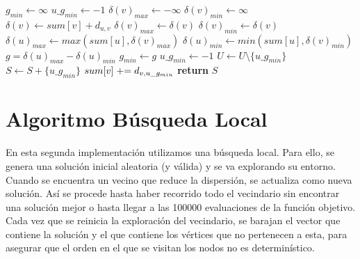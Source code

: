 \begin{algorithm}[H]
\begin{algorithmic}
 
    \State $g_{min} \gets \infty$
    \State $u\_g_{min} \gets -1$
    \State
        \State $\delta(v)_{max} \gets -\infty$
        \State $\delta(v)_{min} \gets \infty$
        \State
            \State $\delta(v) \gets sum[v] + d_{u,v}$
                \State $\delta(v)_{max} \gets \delta(v)$
            \EndIf
                \State $\delta(v)_{min} \gets \delta(v)$
            \EndIf
            \State
            \State $\delta(u)_{max} \gets max(sum[u], \delta(v)_{max})$
            \State $\delta(u)_{min} \gets min(sum[u], \delta(v)_{min})$
            \State $g = \delta(u)_{max} - \delta(u)_{min}$
                \State $g_{min} \gets g$
                \State $u\_g_{min} \gets -1$
            \EndIf
        \EndFor
        \State
        \State $U \gets U \setminus \{u\_g_{min}\}$
        \State $S \gets S + \{u\_g_{min}\}$
    \EndFor
    \State
        \State $sum[v] \mathrel{+}= d_{v,u\_g_{min}}$
    \EndFor
\EndWhile
\State
\State \textbf{return} $S$ 
\end{algorithmic}
\end{algorithm}

\newpage
\section{Algoritmo Búsqueda Local}

En esta segunda implementación utilizamos una búsqueda local. Para ello, se genera una solución inicial aleatoria (y válida) y se va explorando su entorno. Cuando se encuentra un vecino que reduce la dispersión, se actualiza como nueva solución. Así se procede hasta haber recorrido todo el vecindario sin encontrar una solución mejor o hasta llegar a las 100000 evaluaciones de la función objetivo. Cada vez que se reinicia la exploración del vecindario, se barajan el vector que contiene la solución y el que contiene los vértices que no pertenecen a esta, para asegurar que el orden en el que se visitan los nodos no es determinístico.



